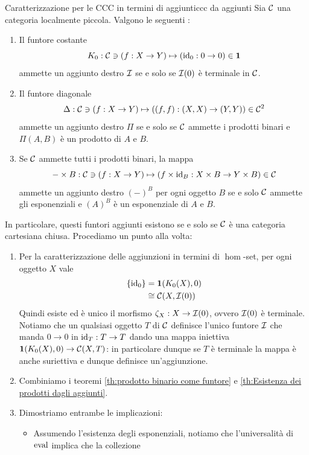 \documentclass[openany]{book}
\renewcommand\C{\mc{C}}
\begin{document}
\newcommand\I{\mc{I}}
\begin{theorem}{Caratterizzazione per le CCC in termini di aggiunti}{ccc da aggiunti}
    Sia $\C$ una categoria localmente piccola. Valgono le seguenti :\begin{enumerate}
        \item Il funtore costante
        \[ K_0 : \C \ni (f:X\to Y) \mapsto (\id_0 : 0 \to 0) \in \mathbf{1} \]
        ammette un aggiunto destro $\I$ se e solo se $\I(0)$ è terminale in $\C$.
        \item Il funtore diagonale
        \[ \Delta : \C \ni (f:X\to Y)\mapsto ((f,f): (X,X)\to(Y,Y)) \in \C^2\]
        ammette un aggiunto destro $\Pi$ se e solo se $\C$ ammette i prodotti binari e $\Pi(A,B)$ è un prodotto di $A$ e $B$.
        \item Se $\C$ ammette tutti i prodotti binari, la mappa 
        \[ -\times B : \C \ni (f:X\to Y) \mapsto (f\times \id_B : X\times B \to Y\times B )\in \C\]
        ammette un aggiunto destro $(-)^B$ per ogni oggetto $B$ se e solo $\C$ ammette gli esponenziali e $(A)^B$ è un esponenziale di $A$ e $B$.
    \end{enumerate}
    In particolare, questi funtori aggiunti esistono se e solo se $\C$ è una categoria cartesiana chiusa.
    \proof 
    Procediamo un punto alla volta:\begin{enumerate}
        \item Per la caratterizzazione delle aggiunzioni in termini di $\hom$-set, per ogni oggetto $X$ vale
            \begin{align*}
                \{\id_0 \} & = \mathbf{1}(K_0(X), 0) \\
                & \cong \C(X, \I(0))
            \end{align*}
            Quindi esiste ed è unico il morfismo $\zeta_X : X \to \I(0)$, ovvero $\I(0)$ è terminale. Notiamo che un qualsiasi oggetto $T$ di $\C$ definisce l'unico funtore $\I$ che manda $0\to 0$ in $\operatorname{id}_T : T\to T$ dando una mappa iniettiva $\mathbf{1}(K_0(X), 0) \to \C(X, T)$: in particolare dunque se $T$ è terminale la mappa è anche suriettiva e dunque definisce un'aggiunzione. 
        \item Combiniamo i teoremi \cref{th:prodotto binario come funtore} e \cref{th:Esistenza dei prodotti dagli aggiunti}.
        \item Dimostriamo entrambe le implicazioni:\begin{itemize}
            \item Assumendo l'esistenza degli esponenziali, notiamo che l'universalità di $\operatorname{eval}$ implica che la collezione 

\end{itemize}
\end{enumerate}
\end{theorem}
\end{document}

